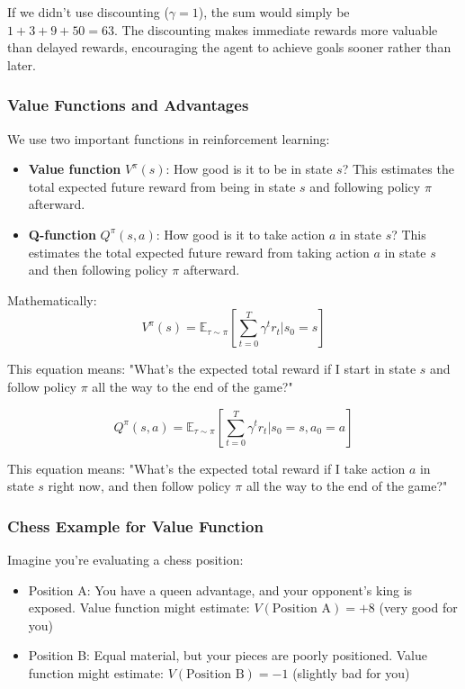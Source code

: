 \documentclass[11pt]{article}
\begin{document}
If we didn't use discounting ($\gamma = 1$), the sum would simply be $1 + 3 + 9 + 50 = 63$. The discounting makes immediate rewards more valuable than delayed rewards, encouraging the agent to achieve goals sooner rather than later.

\subsubsection{Value Functions and Advantages}

We use two important functions in reinforcement learning:
\begin{itemize}
    \item \textbf{Value function} $V^\pi(s)$: How good is it to be in state $s$? This estimates the total expected future reward from being in state $s$ and following policy $\pi$ afterward.
    \item \textbf{Q-function} $Q^\pi(s,a)$: How good is it to take action $a$ in state $s$? This estimates the total expected future reward from taking action $a$ in state $s$ and then following policy $\pi$ afterward.
\end{itemize}

Mathematically:
\begin{equation}
    V^\pi(s) = \mathbb{E}_{\tau \sim \pi} \left[ \sum_{t=0}^{T} \gamma^t r_t | s_0 = s \right]
\end{equation}

This equation means: "What's the expected total reward if I start in state $s$ and follow policy $\pi$ all the way to the end of the game?"

\begin{equation}
    Q^\pi(s,a) = \mathbb{E}_{\tau \sim \pi} \left[ \sum_{t=0}^{T} \gamma^t r_t | s_0 = s, a_0 = a \right]
\end{equation}

This equation means: "What's the expected total reward if I take action $a$ in state $s$ right now, and then follow policy $\pi$ all the way to the end of the game?"

\subsubsection*{Chess Example for Value Function}
Imagine you're evaluating a chess position:
\begin{itemize}
    \item Position A: You have a queen advantage, and your opponent's king is exposed. Value function might estimate: $V(\text{Position A}) = +8$ (very good for you)
    \item Position B: Equal material, but your pieces are poorly positioned. Value function might estimate: $V(\text{Position B}) = -1$ (slightly bad for you)
\end{itemize}
\end{document}
